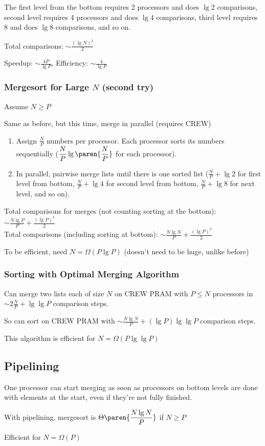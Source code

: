 The first level from the bottom requires 2 processors and does $\lg 2$ comparisons, second level requires 4 processors and does $\lg 4$ comparisons, third level requires 8 and does $\lg 8$ comparisons, and so on.

Total comparisons: $\displaystyle \sim \frac{(\lg N)^2}{2}$

Speedup: $\displaystyle \sim \frac{4P}{\lg P}$, Efficiency: $\displaystyle \sim \frac{4}{\lg P}$

\subsubsection*{Mergesort for Large $N$ (second try)}

Assume $N \geq P$

Same as before, but this time, merge in parallel (requires CREW)

\begin{enumerate}
    \item Assign $\frac N P$ numbers per processor. Each processor sorts its numbers sequentially ($\displaystyle \frac N P \lg\paren{\frac N P}$ for each processor).
    \item In parallel, pairwise merge lists until there is one sorted list ($\frac{N}{P} + \lg 2$ for first level from bottom, $\frac{N}{P} + \lg 4$ for second level from bottom, $\frac{N}{P} + \lg 8$ for next level, and so on).
\end{enumerate}

Total comparisons for merges (not counting sorting at the bottom): $\displaystyle \sim \frac{N \lg P}{P} + \frac{(\lg P)^2}{2}$\\
Total comparisons (including sorting at bottom): $\displaystyle \sim \frac{N \lg N}{P} + \frac{(\lg P)^2}{2}$

To be efficient, need $N = \Omega(P \lg P)$ (doesn't need to be huge, unlike before)

\subsubsection*{Sorting with Optimal Merging Algorithm}

Can merge two lists each of size $N$ on CREW PRAM with $P \leq N$ processors in $\sim 2\frac N P + \lg \lg P$ comparison steps.

So can sort on CREW PRAM with $\displaystyle \sim \frac{N \lg N}{P} + (\lg P)\lg \lg P$ comparison steps.

This algorithm is efficient for $N = \Omega(P \lg \lg P)$

\subsection*{Pipelining}

One processor can start merging as soon as processors on bottom levels are done with elements at the start, even if they're not fully finished.

With pipelining, mergesort is $\displaystyle \Theta\paren{\frac{N \lg N}{P}}$ if $N \geq P$

Efficient for $N = \Omega(P)$
